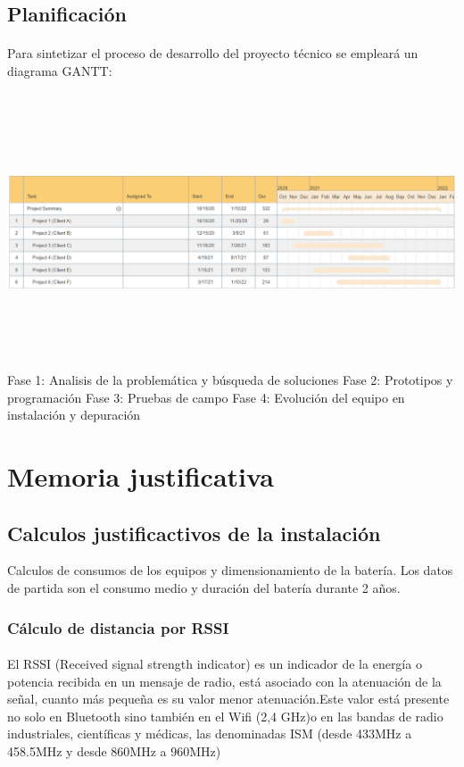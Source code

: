 \documentclass[a4paper ,12pt, onecolumn]{article}
\begin{document}
    \subsection{Planificación}
        \paragraph{}
        Para sintetizar el proceso de desarrollo del proyecto técnico se empleará un diagrama GANTT: 
        \paragraph{}
        \includegraphics[width=15cm, height=8cm]{gantt.PNG}
        Fase 1: Analisis de la problemática y búsqueda de soluciones
        Fase 2: Prototipos y programación
        Fase 3: Pruebas de campo
        Fase 4: Evolución del equipo en instalación y depuración 
\section{Memoria justificativa}
    \subsection{Calculos justificactivos de la instalación}
        Calculos de consumos de los equipos y dimensionamiento de la batería.
        Los datos de partida son el consumo medio y duración del batería durante 2 años.
        \subsubsection{ Cálculo de distancia por RSSI}
            \paragraph{}
            El RSSI (Received signal strength indicator) es un indicador de la energía o potencia recibida en un mensaje de radio, 
            está asociado con la atenuación de la señal, cuanto más pequeña es su valor menor atenuación.Este valor está 
            presente no solo en Bluetooth sino también en el Wifi (2,4 GHz)o en las bandas de radio industriales, científicas y médicas,
            las denominadas ISM (desde 433MHz a 458.5MHz y desde 860MHz a 960MHz)
\end{document}
